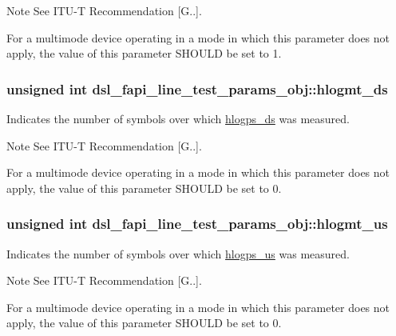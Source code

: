 \begin{DoxyNote}{Note}
See I\-T\-U-\/\-T Recommendation \mbox{[}G..\mbox{]}. 

For a multimode device operating in a mode in which this parameter does not apply, the value of this parameter S\-H\-O\-U\-L\-D be set to 1. 
\end{DoxyNote}
\hypertarget{structdsl__fapi__line__test__params__obj_af530199f0de8204228c7df7ddd8436f7}{
\subsubsection[{hlogmt\-\_\-ds}]{\setlength{\rightskip}{0pt plus 5cm}unsigned int dsl\-\_\-fapi\-\_\-line\-\_\-test\-\_\-params\-\_\-obj\-::hlogmt\-\_\-ds}}\label{structdsl__fapi__line__test__params__obj_af530199f0de8204228c7df7ddd8436f7}
Indicates the number of symbols over which \hyperlink{structdsl__fapi__line__test__params__obj_a5f64a314b926de0db42b37c794f14daf}{hlogps\-\_\-ds} was measured. \begin{DoxyNote}{Note}
See I\-T\-U-\/\-T Recommendation \mbox{[}G..\mbox{]}. 

For a multimode device operating in a mode in which this parameter does not apply, the value of this parameter S\-H\-O\-U\-L\-D be set to 0. 
\end{DoxyNote}
\hypertarget{structdsl__fapi__line__test__params__obj_a55959d1ae7fc886d4d9e282f33f23f09}{
\subsubsection[{hlogmt\-\_\-us}]{\setlength{\rightskip}{0pt plus 5cm}unsigned int dsl\-\_\-fapi\-\_\-line\-\_\-test\-\_\-params\-\_\-obj\-::hlogmt\-\_\-us}}\label{structdsl__fapi__line__test__params__obj_a55959d1ae7fc886d4d9e282f33f23f09}
Indicates the number of symbols over which \hyperlink{structdsl__fapi__line__test__params__obj_a7d6db75c174584b2fdc5ab0e8ee3d499}{hlogps\-\_\-us} was measured. \begin{DoxyNote}{Note}
See I\-T\-U-\/\-T Recommendation \mbox{[}G..\mbox{]}. 

For a multimode device operating in a mode in which this parameter does not apply, the value of this parameter S\-H\-O\-U\-L\-D be set to 0. 
\end{DoxyNote}

